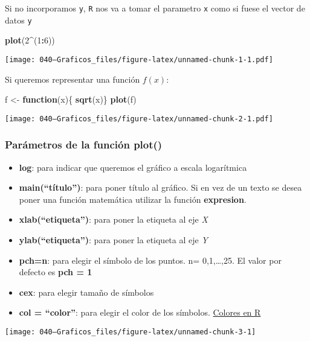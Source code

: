 \documentclass[]{article}
\newenvironment{Shaded}{\begin{snugshade}}{\end{snugshade}}
\newcommand{\ControlFlowTok}[1]{\textcolor[rgb]{0.13,0.29,0.53}{\textbf{#1}}}
\newcommand{\DecValTok}[1]{\textcolor[rgb]{0.00,0.00,0.81}{#1}}
\newcommand{\KeywordTok}[1]{\textcolor[rgb]{0.13,0.29,0.53}{\textbf{#1}}}
\newcommand{\NormalTok}[1]{#1}
\newcommand{\OperatorTok}[1]{\textcolor[rgb]{0.81,0.36,0.00}{\textbf{#1}}}
\newcommand{\StringTok}[1]{\textcolor[rgb]{0.31,0.60,0.02}{#1}}
\providecommand{\tightlist}{%
  \setlength{\itemsep}{0pt}\setlength{\parskip}{0pt}}
\begin{document}
Si no incorporamos \texttt{y}, \texttt{R} nos va a tomar el parametro
\texttt{x} como si fuese el vector de datos \texttt{y}

\begin{Shaded}
\begin{Highlighting}[]
\KeywordTok{plot}\NormalTok{(}\DecValTok{2}\OperatorTok{^}\NormalTok{(}\DecValTok{1}\OperatorTok{:}\DecValTok{6}\NormalTok{))}
\end{Highlighting}
\end{Shaded}

\texttt{[image: 040---Graficos\_files/figure-latex/unnamed-chunk-1-1.pdf]}

Si queremos representar una función \(f(x)\):

\begin{Shaded}
\begin{Highlighting}[]
\NormalTok{f <-}\StringTok{ }\ControlFlowTok{function}\NormalTok{(x)\{ }\KeywordTok{sqrt}\NormalTok{(x)\}}
\KeywordTok{plot}\NormalTok{(f)}
\end{Highlighting}
\end{Shaded}

\texttt{[image: 040---Graficos\_files/figure-latex/unnamed-chunk-2-1.pdf]}

\hypertarget{parametros-de-la-funcion-plot}{%
\subsubsection{Parámetros de la función
plot()}\label{parametros-de-la-funcion-plot}}

\begin{itemize}
\tightlist
\item
  \textbf{log}: para indicar que queremos el gráfico a escala
  logarítmica
\item
  \textbf{main(``título'')}: para poner título al gráfico. Si en vez de
  un texto se desea poner una función matemática utilizar la función
  \textbf{expresion}.
\item
  \textbf{xlab(``etiqueta'')}: para poner la etiqueta al eje \emph{X}
\item
  \textbf{ylab(``etiqueta'')}: para poner la etiqueta al eje \emph{Y}
\item
  \textbf{pch=n}: para elegir el símbolo de los puntos. n=
  0,1,\ldots{},25. El valor por defecto es \textbf{pch = 1}
\item
  \textbf{cex}: para elegir tamaño de símbolos
\item
  \textbf{col = ``color''}: para elegir el color de los símbolos.
  \href{http://www.stat.columbia.edu/~tzheng/files/Rcolor.pdf}{Colores
  en R}
\end{itemize}

\begin{center}\texttt{[image: 040---Graficos\_files/figure-latex/unnamed-chunk-3-1]} \end{center}
\end{document}
